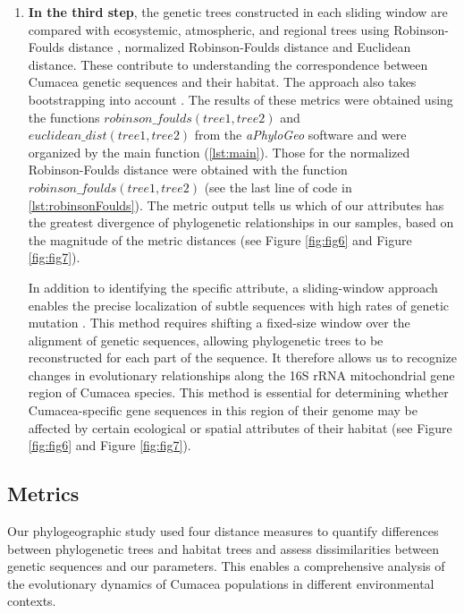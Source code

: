 {\begin{enumerate}
\item \textbf{In the third step}, the genetic trees constructed in each sliding window are compared with ecosystemic, atmospheric, and regional trees using Robinson-Foulds distance \citep{robinson_comparison_1981}, normalized Robinson-Foulds distance and Euclidean distance. These contribute to understanding the correspondence between Cumacea genetic sequences and their habitat. The approach also takes bootstrapping into account \citep{koshkarov_phylogeography_2022}. The results of these metrics were obtained using the functions $robinson\_foulds(tree1, tree2)$ and $euclidean\_dist(tree1, tree2)$ from the \textit{aPhyloGeo} software and were organized by the main function (\autoref{lst:main}). Those for the normalized Robinson-Foulds distance were obtained with the function $robinson\_foulds(tree1, tree2)$ (see the last line of code in \autoref{lst:robinsonFoulds}). The metric output tells us which of our attributes has the greatest divergence of phylogenetic relationships in our samples, based on the magnitude of the metric distances (see Figure \ref{fig:fig6} and Figure \ref{fig:fig7}). 

In addition to identifying the specific attribute, a sliding-window approach enables the precise localization of subtle sequences with high rates of genetic mutation \citep{koshkarov_phylogeography_2022}. This method requires shifting a fixed-size window over the alignment of genetic sequences, allowing phylogenetic trees to be reconstructed for each part of the sequence. It therefore allows us to recognize changes in evolutionary relationships along the 16S rRNA mitochondrial gene region of Cumacea species. This method is essential for determining whether Cumacea-specific gene sequences in this region of their genome may be affected by certain ecological or spatial attributes of their habitat (see Figure \ref{fig:fig6} and Figure \ref{fig:fig7}).
\end{enumerate}

\subsection{Metrics}\label{metrics}
Our phylogeographic study used four distance measures to quantify differences between phylogenetic trees and habitat trees and assess dissimilarities between genetic sequences and our parameters. This enables a comprehensive analysis of the evolutionary dynamics of Cumacea populations in different environmental contexts. 

}
